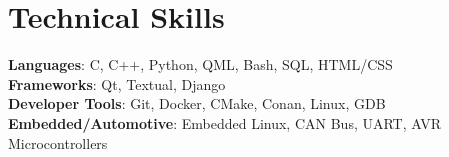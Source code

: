\documentclass[letterpaper,11pt]{article}
\begin{document}
%
\section{Technical Skills}
 \begin{itemize}[leftmargin=0.15in, label={}]
    \small{\item{
     \textbf{Languages}{: C, C++, Python, QML, Bash, SQL, HTML/CSS} \\
     \textbf{Frameworks}{: Qt, Textual, Django} \\
     \textbf{Developer Tools}{: Git, Docker, CMake, Conan, Linux, GDB} \\
     \textbf{Embedded/Automotive}{: Embedded Linux, CAN Bus, UART, AVR Microcontrollers}
    }}
 \end{itemize}


\end{document}
